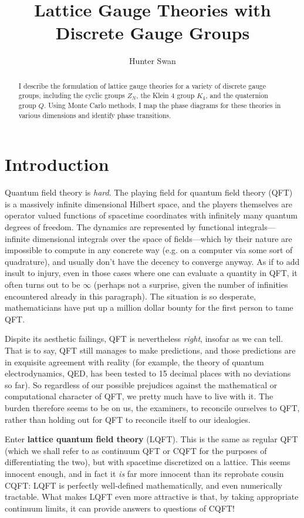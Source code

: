 \documentclass[9pt,twocolumn,twoside]{article}
\begin{document}
\title{Lattice Gauge Theories with Discrete Gauge Groups}
\author{Hunter Swan}

\maketitle
\begin{abstract}
I describe the formulation of lattice gauge theories for a variety of discrete gauge groups, including the cyclic groups $Z_N$, the Klein 4 group $K_4$, and the quaternion group $Q$.  Using Monte Carlo methods, I map the phase diagrams for these theories in various dimensions and identify phase transitions.
\end{abstract}

\section{Introduction}
Quantum field theory is \textit{hard}.  The playing field for quantum field theory (QFT) is a massively infinite dimensional Hilbert space, and the players themselves are operator valued functions of spacetime coordinates with infinitely many quantum degrees of freedom.  The dynamics are represented by functional integrals---infinite dimensional integrals over the space of fields---which by their nature are impossible to compute in any concrete way (e.g. on a computer via some sort of quadrature), and usually don't have the decency to converge anyway.  As if to add insult to injury, even in those cases where one can evaluate a quantity in QFT, it often turns out to be $\infty$ (perhaps not a surprise, given the number of infinities encountered already in this paragraph).  The situation is so desperate, mathematicians have put up a million dollar bounty for the first person to tame QFT.

Dispite its aesthetic failings, QFT is nevertheless \textit{right}, insofar as we can tell.  That is to say, QFT still manages to make predictions, and those predictions are in exquisite agreement with reality (for example, the theory of quantum electrodynamics, QED, has been tested to 15 decimal places with no deviations so far).  So regardless of our possible prejudices against the mathematical or computational character of QFT, we pretty much have to live with it.  The burden therefore seems to be on us, the examiners, to reconcile ourselves to QFT, rather than holding out for QFT to reconcile itself to our idealogies.  

Enter \textbf{lattice quantum field theory} (LQFT).  This is the same as regular QFT (which we shall refer to as continuum QFT or CQFT for the purposes of differentiating the two), but with spacetime discretized on a lattice.  This seems innocent enough, and in fact it \textit{is} far more innocent than its reprobate cousin CQFT: LQFT is perfectly well-defined mathematically, and even numerically tractable.  What makes LQFT even more attractive is that, by taking appropriate continuum limits, it can provide answers to questions of CQFT!
\end{document}
